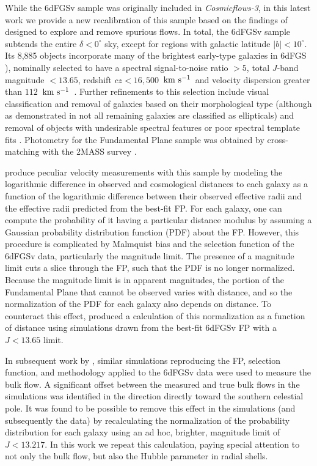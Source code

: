 \documentclass[twocolumn]{aastex63}
\newcommand{\kms}{\mbox{${\rm km~s^{-1}}$}}
\begin{document}
While the 6dFGSv sample was originally included in {\it Cosmicflows-3}, in this latest work we provide a new recalibration of this sample based on the findings of \cite{Qin2018} designed to explore and remove spurious flows. In total, the 6dFGSv sample subtends the entire $\delta<0^{\circ}$ sky, except for regions with galactic latitude $|b|<10^{\circ}$.  Its 8,885 objects incorporate many of the brightest early-type galaxies in 6dFGS \citealt{2009MNRAS.399..683J}), nominally selected to have a spectral signal-to-noise ratio $>5$, total $J$-band magnitude $< 13.65$, redshift $cz<16,500$~\kms\ and velocity dispersion greater than $112$~\kms\ \citep{2014MNRAS.443.1231C}. Further refinements to this selection include visual classification and removal of galaxies based on their morphological type (although as demonstrated in \citet{2016AJ....152...50T} not all remaining galaxies are classified as ellipticals) and removal of objects with undesirable spectral features or poor spectral template fits \citep{2014MNRAS.443.1231C}. Photometry for the Fundamental Plane sample was obtained by cross-matching with the 2MASS survey \citep{2000AJ....119.2498J, 2006AJ....131.1163S}.

\cite{2014MNRAS.445.2677S} produce peculiar velocity measurements with this sample by modeling the logarithmic difference in observed and cosmological distances to each galaxy as a function of the logarithmic difference between their observed effective radii and the effective radii predicted from the best-fit FP. For each galaxy, one can compute the probability of it having a particular distance modulus by assuming a Gaussian probability distribution function (PDF) about the FP. However, this procedure is complicated by Malmquist bias and the selection function of the 6dFGSv data, particularly the magnitude limit. The presence of a magnitude limit cuts a slice through the FP, such that the PDF is no longer normalized. Because the magnitude limit is in apparent magnitudes, the portion of the Fundamental Plane that cannot be observed varies with distance, and so the normalization of the PDF for each galaxy also depends on distance. To counteract this effect, \cite{2014MNRAS.445.2677S} produced a calculation of this normalization as a function of distance using simulations drawn from the best-fit 6dFGSv FP with a $J<13.65$ limit.

In subsequent work by \cite{Qin2018}, similar simulations reproducing the FP, selection function, and methodology applied to the 6dFGSv data were used to measure the bulk flow. A significant offset between the measured and true bulk flows in the simulations was identified in the direction directly toward the southern celestial pole. It was found to be possible to remove this effect in the simulations (and subsequently the data) by recalculating the normalization of the probability distribution for each galaxy using an ad hoc, brighter, magnitude limit of $J<13.217$. In this work we repeat this calculation, paying special attention to not only the bulk flow, but also the Hubble parameter in radial shells.
\end{document}
